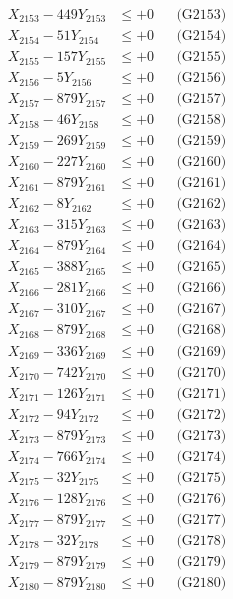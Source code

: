 \documentclass[a4paper,10pt]{article}
\begin{document}
{\begin{align}
X_{2153} - 449Y_{2153} &\leq +0 && \text{(G2153)} \\
X_{2154} - 51Y_{2154} &\leq +0 && \text{(G2154)} \\
X_{2155} - 157Y_{2155} &\leq +0 && \text{(G2155)} \\
X_{2156} - 5Y_{2156} &\leq +0 && \text{(G2156)} \\
X_{2157} - 879Y_{2157} &\leq +0 && \text{(G2157)} \\
X_{2158} - 46Y_{2158} &\leq +0 && \text{(G2158)} \\
X_{2159} - 269Y_{2159} &\leq +0 && \text{(G2159)} \\
X_{2160} - 227Y_{2160} &\leq +0 && \text{(G2160)} \\
\allowbreak
X_{2161} - 879Y_{2161} &\leq +0 && \text{(G2161)} \\
X_{2162} - 8Y_{2162} &\leq +0 && \text{(G2162)} \\
X_{2163} - 315Y_{2163} &\leq +0 && \text{(G2163)} \\
X_{2164} - 879Y_{2164} &\leq +0 && \text{(G2164)} \\
X_{2165} - 388Y_{2165} &\leq +0 && \text{(G2165)} \\
X_{2166} - 281Y_{2166} &\leq +0 && \text{(G2166)} \\
X_{2167} - 310Y_{2167} &\leq +0 && \text{(G2167)} \\
X_{2168} - 879Y_{2168} &\leq +0 && \text{(G2168)} \\
X_{2169} - 336Y_{2169} &\leq +0 && \text{(G2169)} \\
X_{2170} - 742Y_{2170} &\leq +0 && \text{(G2170)} \\
\allowbreak
X_{2171} - 126Y_{2171} &\leq +0 && \text{(G2171)} \\
X_{2172} - 94Y_{2172} &\leq +0 && \text{(G2172)} \\
X_{2173} - 879Y_{2173} &\leq +0 && \text{(G2173)} \\
X_{2174} - 766Y_{2174} &\leq +0 && \text{(G2174)} \\
X_{2175} - 32Y_{2175} &\leq +0 && \text{(G2175)} \\
X_{2176} - 128Y_{2176} &\leq +0 && \text{(G2176)} \\
X_{2177} - 879Y_{2177} &\leq +0 && \text{(G2177)} \\
X_{2178} - 32Y_{2178} &\leq +0 && \text{(G2178)} \\
X_{2179} - 879Y_{2179} &\leq +0 && \text{(G2179)} \\
X_{2180} - 879Y_{2180} &\leq +0 && \text{(G2180)} \\

\end{align}}
\end{document}
